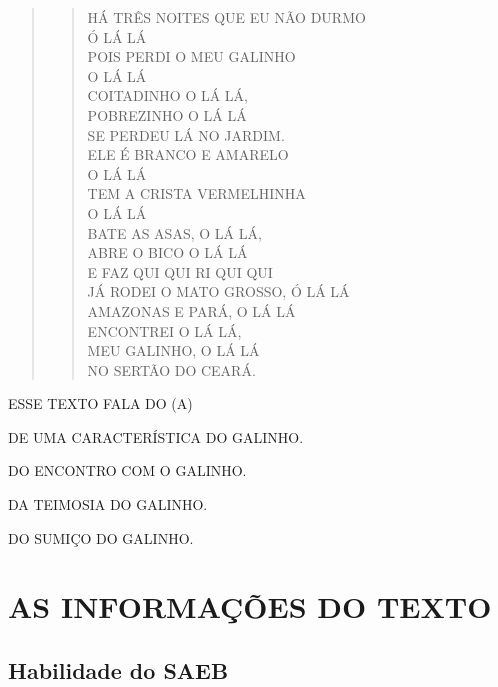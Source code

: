 \begin{quote}
\begin{verse}
HÁ TRÊS NOITES QUE EU NÃO DURMO\\
Ó LÁ LÁ\\
POIS PERDI O MEU GALINHO\\
O LÁ LÁ\\
COITADINHO O LÁ LÁ,\\
POBREZINHO O LÁ LÁ\\
SE PERDEU LÁ NO JARDIM.\\
ELE É BRANCO E AMARELO\\
O LÁ LÁ\\
TEM A CRISTA VERMELHINHA\\
O LÁ LÁ\\
BATE AS ASAS, O LÁ LÁ,\\
ABRE O BICO O LÁ LÁ\\
E FAZ QUI QUI RI QUI QUI\\
JÁ RODEI O MATO GROSSO, Ó LÁ LÁ\\
AMAZONAS E PARÁ, O LÁ LÁ\\
ENCONTREI O LÁ LÁ,\\
MEU GALINHO, O LÁ LÁ\\
NO SERTÃO DO CEARÁ.
\end{verse}

\end{quote}

ESSE TEXTO FALA DO (A)

\begin{escolha}
\item DE UMA CARACTERÍSTICA DO GALINHO.

\item DO ENCONTRO COM O GALINHO.

\item DA TEIMOSIA DO GALINHO.

\item DO SUMIÇO DO GALINHO.
\end{escolha}

\chapter{AS INFORMAÇÕES DO TEXTO}

\section*{Habilidade do SAEB}

